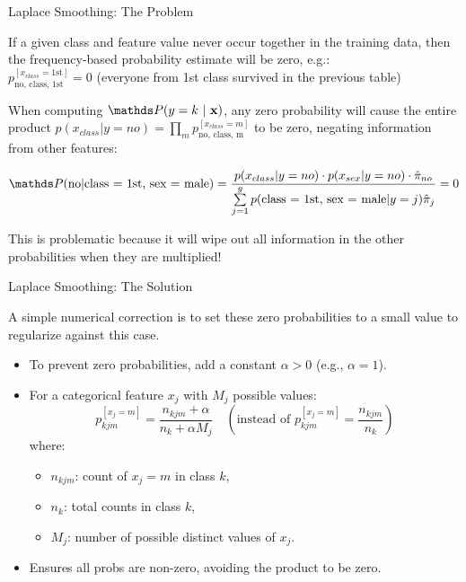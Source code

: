\documentclass[11pt,compress,t,notes=noshow, xcolor=table]{beamer}
\begin{document}
\begin{vbframe}{Laplace Smoothing: The Problem}
\begin{small}
If a given class and feature value never occur together in the training data, then the frequency-based probability estimate will be zero, e.g.:\\
$p_{\text{no, class, 1st}}^{[x_{class} = \text{1st}]} = 0$ (everyone from 1st class survived in the previous table)

\lz

When computing $\postk$, any zero probability will cause the entire product $p(x_{class} | y = no) = \prod_m p_{\text{no, class, m}}^{[x_{class} = m]}$ to be zero, negating information from other features:

$$
\P(\text{no} | \text{class = 1st, sex = male}) = \frac{p(x_{class} | y = no) \cdot p(x_{sex} | y = no)\cdot \pikh[no]}{\sumjg p(\text{class = 1st, sex = male} | y = j)\pih_j} = 0
$$

This is problematic because it will wipe out all information in the other probabilities when they are multiplied!

\lz


\end{small}

\end{vbframe}


\begin{vbframe}{Laplace Smoothing: The Solution}

A simple numerical correction is to set these zero probabilities to a small value to regularize against this case.
 
\begin{itemize}
\item To prevent zero probabilities, add a constant $\alpha > 0$ (e.g., $\alpha = 1$).
\item For a categorical feature $x_j$ with $M_j$ possible values:
  $$
  p_{kjm}^{[x_j = m]} = \frac{n_{kjm} + \alpha}{n_{k} + \alpha M_j} \quad \left(\text{instead of }  p_{kjm}^{[x_j = m]} = \frac{n_{kjm}}{n_{k}} \right)
  $$
  where:
  \begin{itemize}
    \item $n_{kjm}$: count of $x_j = m$ in class $k$,
    \item $n_{k}$: total counts in class $k$,
    \item $M_j$: number of possible distinct values of $x_j$.
  \end{itemize}
\item Ensures all probs are non-zero, avoiding the product to be zero.
\end{itemize}

\end{vbframe}
\end{document}

